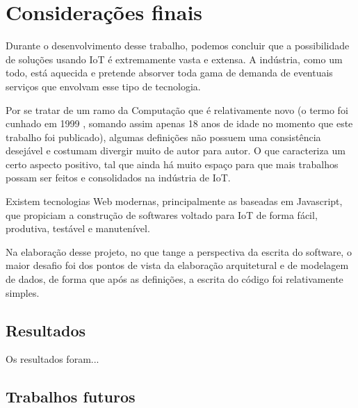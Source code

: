 \section*{Considerações finais}

Durante o desenvolvimento desse trabalho, podemos concluir que a possibilidade de soluções usando IoT é extremamente vasta e extensa. A indústria, como um todo, está aquecida e pretende absorver toda gama de demanda de eventuais serviços que envolvam esse tipo de tecnologia.

Por se tratar de um ramo da Computação que é relativamente novo (o termo foi cunhado em 1999 \cite{Kevin}, somando assim apenas 18 anos de idade no momento que este trabalho foi publicado), algumas definições não possuem uma consistência desejável e costumam divergir muito de autor para autor. O que caracteriza um certo aspecto positivo, tal que ainda há muito espaço para que mais trabalhos possam ser feitos e consolidados na indústria de IoT.

Existem tecnologias Web modernas, principalmente as baseadas em Javascript, que propiciam a construção de softwares voltado para IoT de forma fácil, produtiva, testável e manutenível.

Na elaboração desse projeto, no que tange a perspectiva da escrita do software, o maior desafio foi dos pontos de vista da elaboração arquitetural e de modelagem de dados, de forma que após as definições, a escrita do código foi relativamente simples.

\subsection{Resultados}
\label{resultados}
Os resultados foram...

\subsection{Trabalhos futuros}
\label{trabalhosFuturos}





